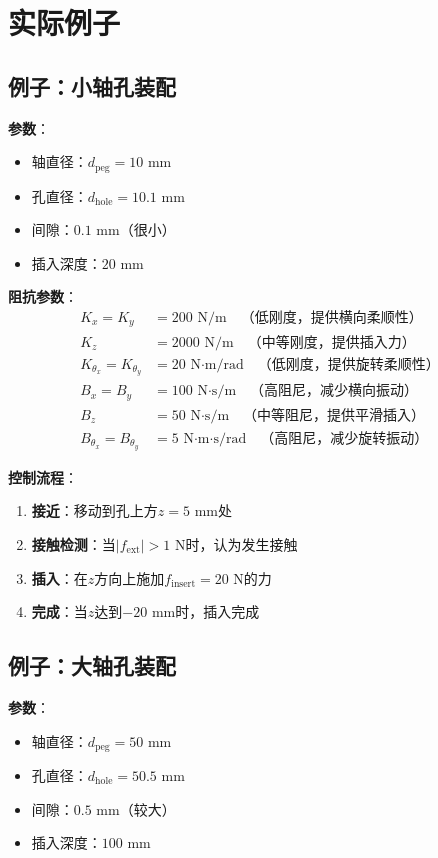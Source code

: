 \documentclass[12pt,a4paper]{article}
\begin{document}
\section{实际例子}

\subsection{例子：小轴孔装配}

\textbf{参数}：
\begin{itemize}
\item 轴直径：$d_{\text{peg}} = 10$ mm
\item 孔直径：$d_{\text{hole}} = 10.1$ mm
\item 间隙：$0.1$ mm（很小）
\item 插入深度：$20$ mm
\end{itemize}

\textbf{阻抗参数}：
\begin{align}
K_x = K_y &= 200 \text{ N/m} \quad \text{（低刚度，提供横向柔顺性）} \\
K_z &= 2000 \text{ N/m} \quad \text{（中等刚度，提供插入力）} \\
K_{\theta_x} = K_{\theta_y} &= 20 \text{ N·m/rad} \quad \text{（低刚度，提供旋转柔顺性）} \\
B_x = B_y &= 100 \text{ N·s/m} \quad \text{（高阻尼，减少横向振动）} \\
B_z &= 50 \text{ N·s/m} \quad \text{（中等阻尼，提供平滑插入）} \\
B_{\theta_x} = B_{\theta_y} &= 5 \text{ N·m·s/rad} \quad \text{（高阻尼，减少旋转振动）}
\end{align}

\textbf{控制流程}：
\begin{enumerate}
\item \textbf{接近}：移动到孔上方$z = 5$ mm处
\item \textbf{接触检测}：当$|f_{\text{ext}}| > 1$ N时，认为发生接触
\item \textbf{插入}：在$z$方向上施加$f_{\text{insert}} = 20$ N的力
\item \textbf{完成}：当$z$达到$-20$ mm时，插入完成
\end{enumerate}

\subsection{例子：大轴孔装配}

\textbf{参数}：
\begin{itemize}
\item 轴直径：$d_{\text{peg}} = 50$ mm
\item 孔直径：$d_{\text{hole}} = 50.5$ mm
\item 间隙：$0.5$ mm（较大）
\item 插入深度：$100$ mm
\end{itemize}
\end{document}
